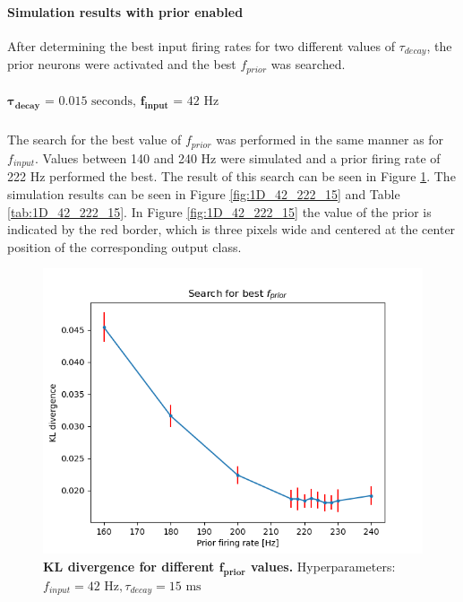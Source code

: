 \paragraph{Simulation results with prior enabled}
After determining the best input firing rates for two different values of $\tau_{decay}$, the prior neurons were activated and the best $f_{prior}$ was searched.
\subparagraph{$\boldsymbol{\tau_{decay}} \text{ = 0.015 seconds, }\mathbf{f_{input}} \text{ = 42 Hz}$}
The search for the best value of $f_{prior}$ was performed in the same manner as for $f_{input}$. Values between 140 and 240 Hz were simulated and a prior firing rate of 222 Hz performed the best. The result of this search can be seen in Figure \ref{fig:1D_KLD_fInput42_tau15}. The simulation results can be seen in Figure \ref{fig:1D_42_222_15} and Table \ref{tab:1D_42_222_15}. In Figure \ref{fig:1D_42_222_15} the value of the prior is indicated by the red border, which is three pixels wide and centered at the center position of the corresponding output class.

\begin{figure}
\centering
  \includegraphics[width=0.75\linewidth]{figures/1D/KLDvsfPrior_fInput42tau15.png}
  \caption{\textbf{KL divergence for different $\mathbf{f_{prior}}$ values.} Hyperparameters: $f_{input} = 42\text{ Hz}, \tau_{decay} = 15\text{ ms}$}
  \label{fig:1D_KLD_fInput42_tau15}
\end{figure}

